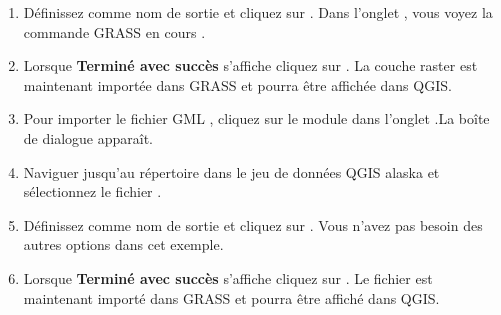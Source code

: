 \begin{enumerate}
  \item D\'efinissez  comme nom de sortie et cliquez sur . Dans l'onglet , vous voyez la commande GRASS en cours .
  \item Lorsque \textbf{Termin\'e avec succ\`es} s'affiche cliquez sur . 
  La couche raster  est maintenant import\'ee dans GRASS et pourra \^etre affich\'ee dans QGIS.
  
  \item Pour importer le fichier GML , cliquez sur le module  dans l'onglet .La bo\^ite de dialogue   appara\^it.
  \item Naviguer jusqu'au r\'epertoire  dans le jeu de donn\'ees QGIS alaska et s\'electionnez le fichier .
  \item D\'efinissez  comme nom de sortie et cliquez sur . Vous n'avez pas besoin des autres options dans cet exemple.
  \item Lorsque \textbf{Termin\'e avec succ\`es} s'affiche cliquez sur . 
  Le fichier  est maintenant import\'e dans GRASS et pourra \^etre affich\'e dans QGIS.
\end{enumerate}


